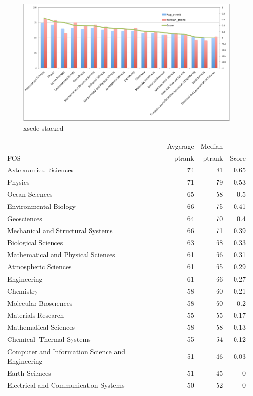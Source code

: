 \documentclass{sig-alternate}
\begin{document}
\begin{figure}[htb] 
  \centering 
    \includegraphics[width=1.0\textwidth]{images-new/b.pdf} 
  \caption{xsede stacked}\label{F:xsede-stacked} 
\end{figure} 


\begin{table}[h]
\begin{tiny}
\begin{tabular}{p{}rrr}
       & Avgerage  & Median  &  \\
FOS & ptrank & ptrank & Score \\
\hline
Astronomical Sciences & 74 & 81 & 0.65 \\
Physics & 71 & 79 & 0.53 \\
Ocean Sciences & 65 & 58 & 0.5 \\
Environmental Biology & 66 & 75 & 0.41 \\
Geosciences & 64 & 70 & 0.4 \\
Mechanical and Structural Systems &  66 & 71 & 0.39 \\
Biological Sciences & 63 & 68 & 0.33 \\
Mathematical and Physical Sciences & 61 & 66 & 0.31 \\
Atmospheric Sciences &  61 & 65 & 0.29 \\
Engineering & 61 & 66 & 0.27 \\
Chemistry &  58 & 60 & 0.21 \\
Molecular Biosciences & 58 & 60 & 0.2 \\
Materials Research & 55 & 55 & 0.17 \\
Mathematical Sciences & 58 & 58 & 0.13 \\
Chemical, Thermal Systems &  55 & 54 & 0.12 \\
Computer and Information Science and Engineering & 51 & 46 & 0.03 \\
Earth Sciences & 51 & 45 & 0 \\
Electrical and Communication Systems &  50 & 52 &  0 \\
\end{tabular}
\end{tiny}
\end{table}
\end{document}
